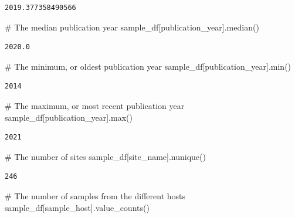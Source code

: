 \documentclass[
  letterpaper,
]{book}
\newenvironment{Shaded}{}{}
\newcommand{\BuiltInTok}[1]{\textcolor[rgb]{0.84,0.23,0.29}{#1}}
\newcommand{\CommentTok}[1]{\textcolor[rgb]{0.42,0.45,0.49}{#1}}
\newcommand{\NormalTok}[1]{\textcolor[rgb]{0.14,0.16,0.18}{#1}}
\newcommand{\StringTok}[1]{\textcolor[rgb]{0.01,0.18,0.38}{#1}}
\begin{document}
\begin{verbatim}
2019.377358490566
\end{verbatim}

\begin{Shaded}
\begin{Highlighting}[]
\CommentTok{\# The median publication year}
\NormalTok{sample\_df[}\StringTok{\textquotesingle{}publication\_year\textquotesingle{}}\NormalTok{].median()}
\end{Highlighting}
\end{Shaded}

\begin{verbatim}
2020.0
\end{verbatim}

\begin{Shaded}
\begin{Highlighting}[]
\CommentTok{\# The minimum, or oldest publication year}
\NormalTok{sample\_df[}\StringTok{\textquotesingle{}publication\_year\textquotesingle{}}\NormalTok{].}\BuiltInTok{min}\NormalTok{()}
\end{Highlighting}
\end{Shaded}

\begin{verbatim}
2014
\end{verbatim}

\begin{Shaded}
\begin{Highlighting}[]
\CommentTok{\# The maximum, or most recent publication year}
\NormalTok{sample\_df[}\StringTok{\textquotesingle{}publication\_year\textquotesingle{}}\NormalTok{].}\BuiltInTok{max}\NormalTok{()}
\end{Highlighting}
\end{Shaded}

\begin{verbatim}
2021
\end{verbatim}

\begin{Shaded}
\begin{Highlighting}[]
\CommentTok{\# The number of sites}
\NormalTok{sample\_df[}\StringTok{\textquotesingle{}site\_name\textquotesingle{}}\NormalTok{].nunique()}
\end{Highlighting}
\end{Shaded}

\begin{verbatim}
246
\end{verbatim}

\begin{Shaded}
\begin{Highlighting}[]
\CommentTok{\# The number of samples from the different hosts}
\NormalTok{sample\_df[}\StringTok{\textquotesingle{}sample\_host\textquotesingle{}}\NormalTok{].value\_counts()}
\end{Highlighting}
\end{Shaded}
\end{document}
